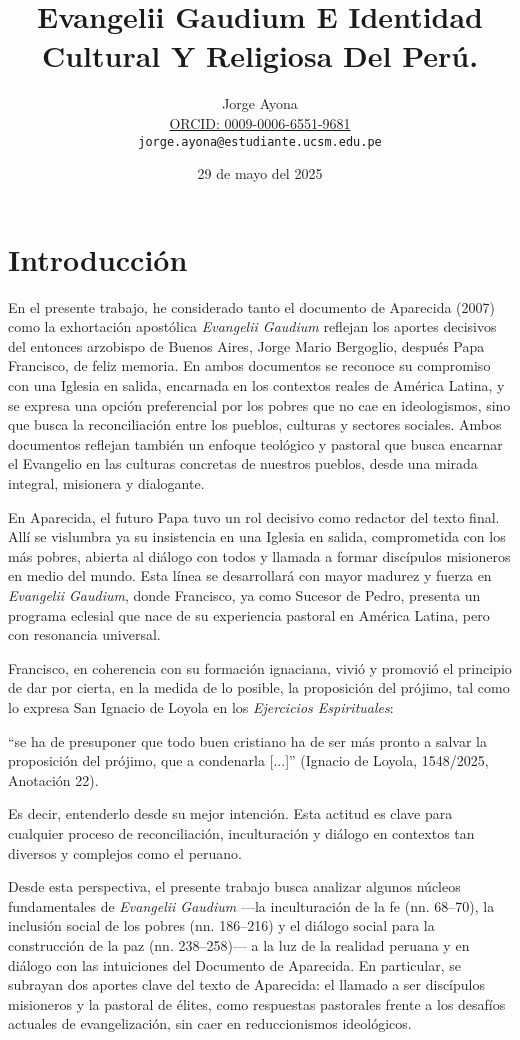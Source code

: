 \documentclass[12pt]{article}
\title{Evangelii Gaudium E Identidad Cultural Y Religiosa Del Perú.}
\author{Jorge Ayona\\
	{\footnotesize \protect\href{https://orcid.org/0009-0006-6551-9681}{ORCID: 0009-0006-6551-9681}}\\
	\texttt{jorge.ayona@estudiante.ucsm.edu.pe}}
\date{29 de mayo del 2025}
\begin{document}
	\maketitle
	\newpage
	\onehalfspacing
	
\section*{Introducción}

En el presente trabajo, he considerado tanto el documento de Aparecida (2007) como la exhortación apostólica \textit{Evangelii Gaudium} reflejan los aportes decisivos del entonces arzobispo de Buenos Aires, Jorge Mario Bergoglio, después Papa Francisco, de feliz memoria. En ambos documentos se reconoce su compromiso con una Iglesia en salida, encarnada en los contextos reales de América Latina, y se expresa una opción preferencial por los pobres que no cae en ideologismos, sino que busca la reconciliación entre los pueblos, culturas y sectores sociales. Ambos documentos reflejan también un enfoque teológico y pastoral que busca encarnar el Evangelio en las culturas concretas de nuestros pueblos, desde una mirada integral, misionera y dialogante.

En Aparecida, el futuro Papa tuvo un rol decisivo como redactor del texto final. Allí se vislumbra ya su insistencia en una Iglesia en salida, comprometida con los más pobres, abierta al diálogo con todos y llamada a formar discípulos misioneros en medio del mundo. Esta línea se desarrollará con mayor madurez y fuerza en \textit{Evangelii Gaudium}, donde Francisco, ya como Sucesor de Pedro, presenta un programa eclesial que nace de su experiencia pastoral en América Latina, pero con resonancia universal.

Francisco, en coherencia con su formación ignaciana, vivió y promovió el principio de dar por cierta, en la medida de lo posible, la proposición del prójimo, tal como lo expresa San Ignacio de Loyola en los \textit{Ejercicios Espirituales}: 
\begin{displayquote}
	“se ha de presuponer que todo buen cristiano ha de ser más pronto a salvar la proposición del prójimo, que a condenarla [...]” (Ignacio de Loyola, 1548/2025, Anotación 22).
\end{displayquote}
Es decir, entenderlo desde su mejor intención. Esta actitud es clave para cualquier proceso de reconciliación, inculturación y diálogo en contextos tan diversos y complejos como el peruano.

Desde esta perspectiva, el presente trabajo busca analizar algunos núcleos fundamentales de \textit{Evangelii Gaudium} —la inculturación de la fe (nn. 68–70), la inclusión social de los pobres (nn. 186–216) y el diálogo social para la construcción de la paz (nn. 238–258)— a la luz de la realidad peruana y en diálogo con las intuiciones del Documento de Aparecida. En particular, se subrayan dos aportes clave del texto de Aparecida: el llamado a ser discípulos misioneros y la pastoral de élites, como respuestas pastorales frente a los desafíos actuales de evangelización, sin caer en reduccionismos ideológicos.
\end{document}
